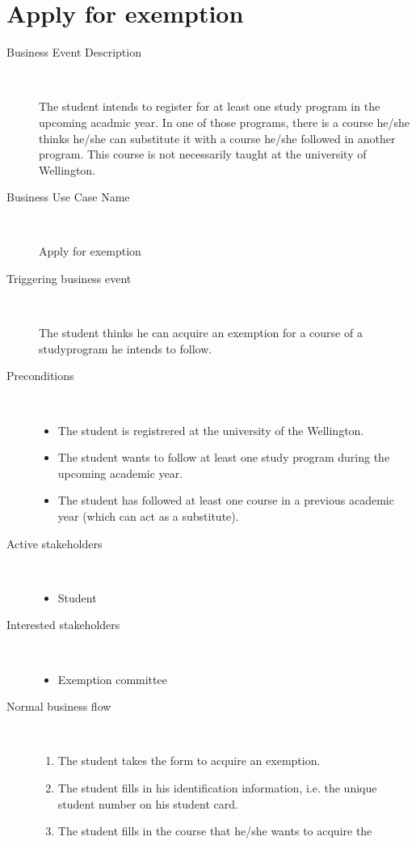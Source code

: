 \section{Apply for exemption}

\begin{description}
	\item[Business Event Description] \ 
		\par The student intends to register for at least one study program in the
		upcoming acadmic year. In one of those programs, there is a course he/she
		thinks he/she can substitute it with a course he/she followed in another
		program. This course is not necessarily taught at the university of
		Wellington.
	\item[Business Use Case Name] \ 
		\par Apply for exemption
	\item[Triggering business event] \ 
		\par The student thinks he can acquire an exemption for a course of a
		studyprogram he intends to follow.
	\item[Preconditions] \
	\begin{itemize}
		\item The student is registrered at the university of the Wellington.
		\item The student wants to follow at least one study program during the
		upcoming academic year. 
		\item The student has followed at least one course in a previous academic year
		(which can act as a substitute).
	\end{itemize}
	\item[Active stakeholders] \ 
	\begin{itemize}
		\item Student
	\end{itemize}
	\item[Interested stakeholders] \ 
		\begin{itemize}
		\item Exemption committee
		\end{itemize}
	\item[Normal business flow] \ 
	\begin{enumerate}
	  	\item The student takes the form to acquire an exemption.
	  	\item The student fills in his identification information, i.e. the unique
	  	student number on his student card.
	  	\item The student fills in the course that he/she wants to acquire the

\end{enumerate}
\end{description}
